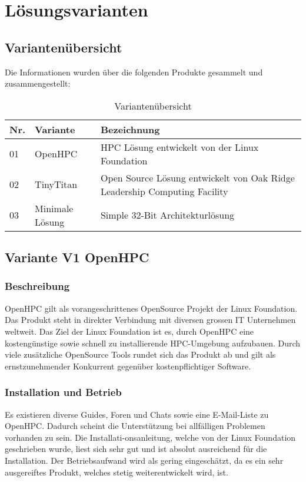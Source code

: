 
\section{Lösungsvarianten}
\subsection{Variantenübersicht}

Die Informationen wurden über die folgenden Produkte gesammelt und zusammengestellt:

\begin{table}[H]
\centering
\begin{tabular}{p{1cm}p{4cm}p{11cm}}
\hline
\rowcolor{heading} \textbf{Nr.} & \textbf{Variante} & \textbf{Bezeichnung} \\\hline
01 & OpenHPC & HPC Lösung entwickelt von der Linux Foundation \\\hline
02 & TinyTitan & Open Source Lösung entwickelt von Oak Ridge Leadership Computing Facility \\\hline
03 & Minimale Lösung & Simple 32-Bit Architekturlösung \\\hline
\end{tabular}
\caption{Variantenübersicht}
\end{table}

\subsection{Variante V1 \flqq OpenHPC\frqq}

\subsubsection{Beschreibung}
OpenHPC gilt als vorangeschrittenes OpenSource Projekt der Linux Foundation. Das Produkt steht in direkter Verbindung mit diversen grossen IT Unternehmen weltweit. Das Ziel der Linux Foundation ist es, durch OpenHPC eine kostengünstige sowie schnell zu installierende HPC-Umgebung aufzubauen. Durch viele zusätzliche OpenSource Tools rundet sich das Produkt ab und gilt als ernstzunehmender Konkurrent gegenüber kostenpflichtiger Software.

\subsubsection{Installation und Betrieb}
Es existieren diverse Guides, Foren und Chats sowie eine E-Mail-Liste zu OpenHPC. Dadurch scheint die Unterstützung bei allfälligen Problemen vorhanden zu sein. Die Installati-onsanleitung, welche von der Linux Foundation geschrieben wurde, liest sich sehr gut und ist absolut ausreichend für die Installation. Der Betriebsaufwand wird als gering eingeschätzt, da es ein sehr ausgereiftes Produkt, welches stetig weiterentwickelt wird, ist.

